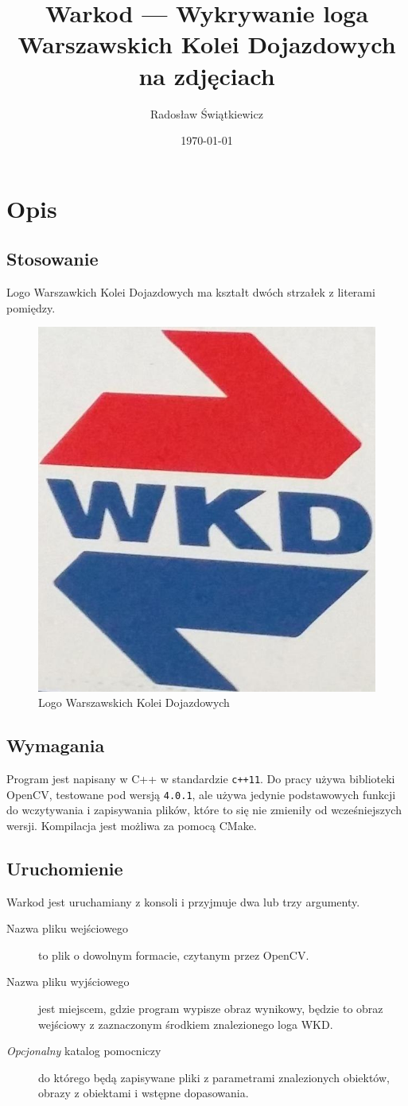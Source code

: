 \documentclass[a4paper,12pt]{article}
\begin{document}
	\title{Warkod --- Wykrywanie loga Warszawskich Kolei Dojazdowych na zdjęciach}
	\author{Radosław Świątkiewicz}
	\date{\today}
	\maketitle
	\tableofcontents
	
	\section{Opis}
		\subsection{Stosowanie}
			Logo Warszawkich Kolei Dojazdowych ma kształt dwóch strzałek z literami pomiędzy.
			\begin{figure}
				\centering
				\includegraphics[width=0.3\linewidth]{logo.jpg}
				\caption{Logo Warszawskich Kolei Dojazdowych}
			\end{figure}
	
		\subsection{Wymagania}
			Program jest napisany w C++ w standardzie \texttt{c++11}.
			Do pracy używa biblioteki OpenCV, testowane pod wersją \texttt{4.0.1}, ale używa jedynie podstawowych funkcji do wczytywania i zapisywania plików, które to się nie zmieniły od wcześniejszych wersji.
			Kompilacja jest możliwa za pomocą CMake.
			
		\subsection{Uruchomienie}
			Warkod jest uruchamiany z konsoli i przyjmuje dwa lub trzy argumenty.
			\begin{description}
				\item[Nazwa pliku wejściowego] to plik o dowolnym formacie, czytanym przez OpenCV.
				\item[Nazwa pliku wyjściowego] jest miejscem, gdzie program wypisze obraz wynikowy, będzie to obraz wejściowy z zaznaczonym środkiem znalezionego loga WKD.
				\item[\textsl{Opcjonalny} katalog pomocniczy] do którego będą zapisywane pliki z parametrami znalezionych obiektów, obrazy z obiektami i wstępne dopasowania.
			\end{description}
			
\end{document}
